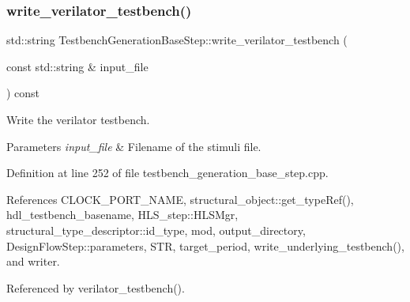 \subsubsection{\texorpdfstring{write\+\_\+verilator\+\_\+testbench()}{write\_verilator\_testbench()}}
{\footnotesize\ttfamily std\+::string Testbench\+Generation\+Base\+Step\+::write\+\_\+verilator\+\_\+testbench (\begin{DoxyParamCaption}\item[{const std\+::string \&}]{input\+\_\+file }\end{DoxyParamCaption}) const\hspace{0.3cm}{\ttfamily [protected]}}



Write the verilator testbench. 


\begin{DoxyParams}{Parameters}
{\em input\+\_\+file} & Filename of the stimuli file. \\
\hline
\end{DoxyParams}


Definition at line 252 of file testbench\+\_\+generation\+\_\+base\+\_\+step.\+cpp.



References C\+L\+O\+C\+K\+\_\+\+P\+O\+R\+T\+\_\+\+N\+A\+ME, structural\+\_\+object\+::get\+\_\+type\+Ref(), hdl\+\_\+testbench\+\_\+basename, H\+L\+S\+\_\+step\+::\+H\+L\+S\+Mgr, structural\+\_\+type\+\_\+descriptor\+::id\+\_\+type, mod, output\+\_\+directory, Design\+Flow\+Step\+::parameters, S\+TR, target\+\_\+period, write\+\_\+underlying\+\_\+testbench(), and writer.



Referenced by verilator\+\_\+testbench().

